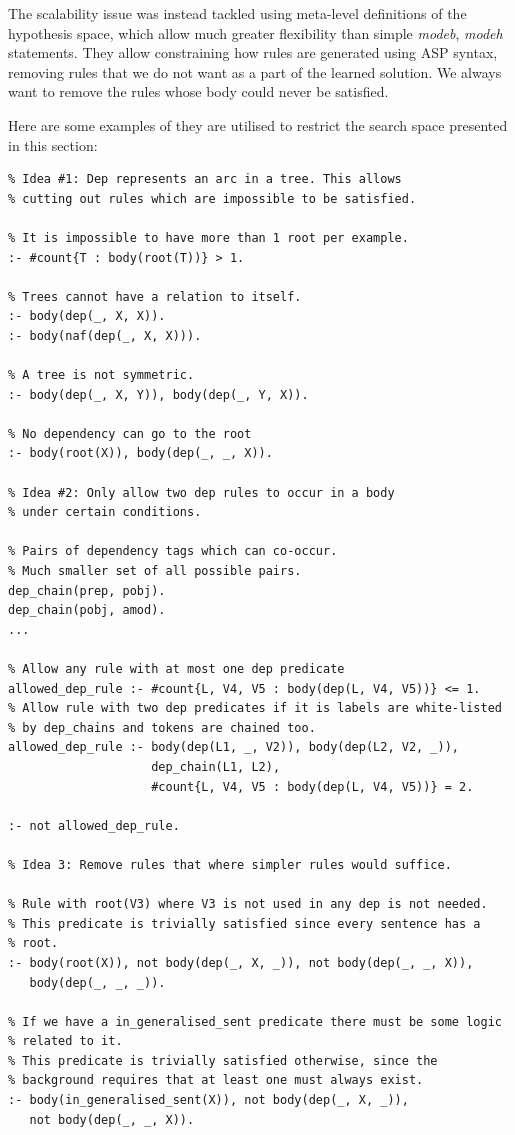 The scalability issue was instead tackled using meta-level definitions of the hypothesis space, which allow much greater flexibility than simple \textit{modeb}, \textit{modeh} statements. 
They allow constraining how rules are generated using ASP syntax, removing rules that we do not want as a part of the learned solution.
We always want to remove the rules whose body could never be satisfied.

Here are some examples of they are utilised to restrict the search space presented in this section:
\begin{verbatim}
% Idea #1: Dep represents an arc in a tree. This allows 
% cutting out rules which are impossible to be satisfied.
    
% It is impossible to have more than 1 root per example.
:- #count{T : body(root(T))} > 1.

% Trees cannot have a relation to itself.
:- body(dep(_, X, X)).
:- body(naf(dep(_, X, X))).

% A tree is not symmetric.
:- body(dep(_, X, Y)), body(dep(_, Y, X)).

% No dependency can go to the root
:- body(root(X)), body(dep(_, _, X)).

% Idea #2: Only allow two dep rules to occur in a body
% under certain conditions. 

% Pairs of dependency tags which can co-occur.
% Much smaller set of all possible pairs.
dep_chain(prep, pobj).
dep_chain(pobj, amod).
...

% Allow any rule with at most one dep predicate
allowed_dep_rule :- #count{L, V4, V5 : body(dep(L, V4, V5))} <= 1.
% Allow rule with two dep predicates if it is labels are white-listed
% by dep_chains and tokens are chained too.
allowed_dep_rule :- body(dep(L1, _, V2)), body(dep(L2, V2, _)), 
                    dep_chain(L1, L2), 
                    #count{L, V4, V5 : body(dep(L, V4, V5))} = 2.

:- not allowed_dep_rule.

% Idea 3: Remove rules that where simpler rules would suffice.

% Rule with root(V3) where V3 is not used in any dep is not needed.
% This predicate is trivially satisfied since every sentence has a 
% root.
:- body(root(X)), not body(dep(_, X, _)), not body(dep(_, _, X)), 
   body(dep(_, _, _)).

% If we have a in_generalised_sent predicate there must be some logic 
% related to it.
% This predicate is trivially satisfied otherwise, since the 
% background requires that at least one must always exist.
:- body(in_generalised_sent(X)), not body(dep(_, X, _)), 
   not body(dep(_, _, X)).


\end{verbatim}

